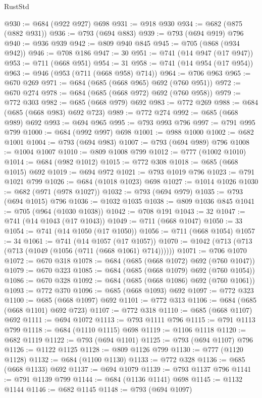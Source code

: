 \begin{lexlean}{RustStd}
\begin{coremodule}
@930 := @684 (@922 @927) @698
@931 := @918 @930
@934 := @682 (@875 (@882 @931))
@936 := @793 (@694 @883)
@939 := @793 (@694 @919) @796
@940 := @936 @939
@942 := @809 @940 @845
@945 := @705 (@868 (@934 @942))
@946 := @708 @186
@947 := 30
@951 := @741 (@14 @947 (@17 @947))
@953 := @711 (@668 @951)
@954 := 31
@958 := @741 (@14 @954 (@17 @954))
@963 := @946 (@953 (@711 (@668 @958) @714))
@964 := @706 @963
@965 := @670 @269
@971 := @684 (@685 (@668 @965) @692 (@760 @951))
@972 := @670 @274
@978 := @684 (@685 (@668 @972) @692 (@760 @958))
@979 := @772 @303
@982 := @685 (@668 @979) @692
@983 := @772 @269
@988 := @684 (@685 (@668 @983) @692 @723)
@989 := @772 @274
@992 := @685 (@668 @989) @692
@993 := @694 @965
@995 := @793 @993 @796
@997 := @791 @995 @799
@1000 := @684 (@992 @997) @698
@1001 := @988 @1000
@1002 := @682 @1001
@1004 := @793 (@694 @983)
@1007 := @793 (@694 @989) @796
@1008 := @1004 @1007
@1010 := @809 @1008 @799
@1012 := @777 (@1002 @1010)
@1014 := @684 (@982 @1012)
@1015 := @772 @308
@1018 := @685 (@668 @1015) @692
@1019 := @694 @972
@1021 := @793 @1019 @796
@1023 := @791 @1021 @799
@1026 := @684 (@1018 @1023) @698
@1027 := @1014 @1026
@1030 := @682 (@971 (@978 @1027))
@1032 := @793 (@694 @979)
@1035 := @793 (@694 @1015) @796
@1036 := @1032 @1035
@1038 := @809 @1036 @845
@1041 := @705 (@964 (@1030 @1038))
@1042 := @708 @191
@1043 := 32
@1047 := @741 (@14 @1043 (@17 @1043))
@1049 := @711 (@668 @1047)
@1050 := 33
@1054 := @741 (@14 @1050 (@17 @1050))
@1056 := @711 (@668 @1054)
@1057 := 34
@1061 := @741 (@14 @1057 (@17 @1057))
@1070 := @1042 (@713 (@713 (@713 (@1049 (@1056 (@711 (@668 @1061) @714))))))
@1071 := @706 @1070
@1072 := @670 @318
@1078 := @684 (@685 (@668 @1072) @692 (@760 @1047))
@1079 := @670 @323
@1085 := @684 (@685 (@668 @1079) @692 (@760 @1054))
@1086 := @670 @328
@1092 := @684 (@685 (@668 @1086) @692 (@760 @1061))
@1093 := @772 @370
@1096 := @685 (@668 @1093) @692
@1097 := @772 @323
@1100 := @685 (@668 @1097) @692
@1101 := @772 @313
@1106 := @684 (@685 (@668 @1101) @692 @723)
@1107 := @772 @318
@1110 := @685 (@668 @1107) @692
@1111 := @694 @1072
@1113 := @793 @1111 @796
@1115 := @791 @1113 @799
@1118 := @684 (@1110 @1115) @698
@1119 := @1106 @1118
@1120 := @682 @1119
@1122 := @793 (@694 @1101)
@1125 := @793 (@694 @1107) @796
@1126 := @1122 @1125
@1128 := @809 @1126 @799
@1130 := @777 (@1120 @1128)
@1132 := @684 (@1100 @1130)
@1133 := @772 @328
@1136 := @685 (@668 @1133) @692
@1137 := @694 @1079
@1139 := @793 @1137 @796
@1141 := @791 @1139 @799
@1144 := @684 (@1136 @1141) @698
@1145 := @1132 @1144
@1146 := @682 @1145
@1148 := @793 (@694 @1097)

\end{coremodule}
\end{lexlean}
